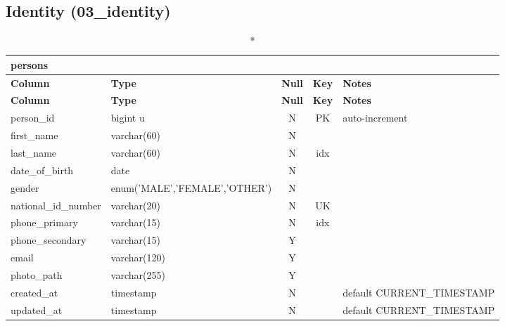 \subsection*{Identity (03\_identity)}
\begin{longtable}{@{}p{3.4cm}p{2.9cm}c c p{5.6cm}@{}}
\caption*{\textbf{persons}}\\
\toprule \textbf{Column} & \textbf{Type} & \textbf{Null} & \textbf{Key} & \textbf{Notes} \\ \midrule \endfirsthead
\toprule \textbf{Column} & \textbf{Type} & \textbf{Null} & \textbf{Key} & \textbf{Notes} \\ \midrule \endhead
\bottomrule \endlastfoot
person\_\allowbreak{}id & bigint u & N & PK & auto-increment \\
first\_\allowbreak{}name & varchar(60) & N &  &  \\
last\_\allowbreak{}name & varchar(60) & N & idx &  \\
date\_\allowbreak{}of\_\allowbreak{}birth & date & N &  &  \\
gender & enum('MALE',\allowbreak{}'FEMALE',\allowbreak{}'OTHER') & N &  &  \\
national\_\allowbreak{}id\_\allowbreak{}number & varchar(20) & N & UK &  \\
phone\_\allowbreak{}primary & varchar(15) & N & idx &  \\
phone\_\allowbreak{}secondary & varchar(15) & Y &  &  \\
email & varchar(120) & Y &  &  \\
photo\_\allowbreak{}path & varchar(255) & Y &  &  \\
created\_\allowbreak{}at & timestamp & N &  & default CURRENT\_\allowbreak{}TIMESTAMP \\
updated\_\allowbreak{}at & timestamp & N &  & default CURRENT\_\allowbreak{}TIMESTAMP \\
\end{longtable}
\vspace{-0.4em}
